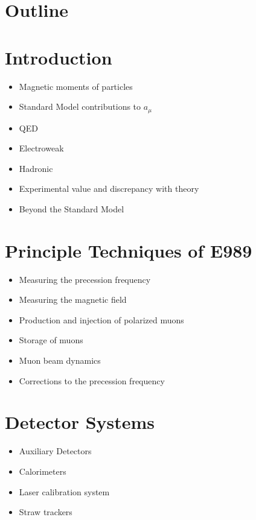 \documentclass[12pt,letterpaper]{article}
\begin{document}
\section*{Outline}

\section{Introduction}

\begin{itemize}
	\item{Magnetic moments of particles}
	\item{Standard Model contributions to $a_{\mu}$}
	\item{QED}
	\item{Electroweak}
	\item{Hadronic}
	\item{Experimental value and discrepancy with theory}
	\item{Beyond the Standard Model}
\end{itemize}

\section{Principle Techniques of E989}

\begin{itemize}
	\item{Measuring the precession frequency}
	\item{Measuring the magnetic field}
	\item{Production and injection of polarized muons}
	\item{Storage of muons}
	\item{Muon beam dynamics}
	\item{Corrections to the precession frequency}
\end{itemize}

\section{Detector Systems}

\begin{itemize}
	\item{Auxiliary Detectors}
	\item{Calorimeters}
	\item{Laser calibration system}
	\item{Straw trackers}
\end{itemize}
\end{document}
